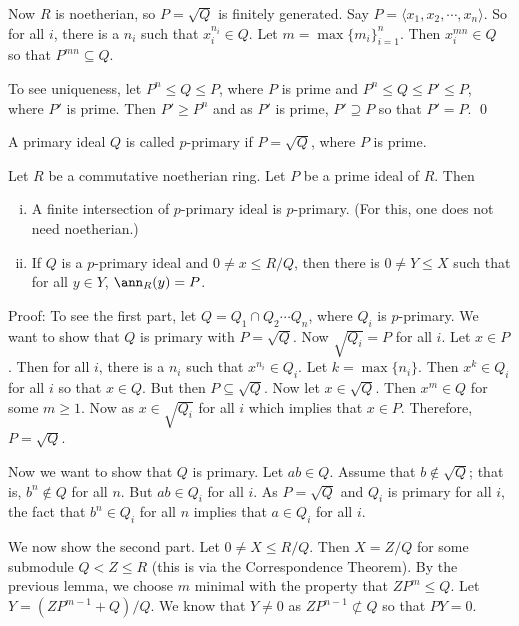  Now $R$ is noetherian, so $P=\sqrt{Q}$ is finitely generated. Say $P=\langle x_1,x_2,\cdots,x_n\rangle$. So for all $i$, there is a $n_i$ such that $x_i^{n_i} \in Q$. Let $m=\max \{m_i\}_{i=1}^n$. Then $x_i^{mn} \in Q$ so that $P^{mn} \subseteq Q$. 

To see uniqueness, let $P^n \leq Q \leq P$, where $P$ is prime and $P^n \leq Q \leq P' \leq P$, where $P'$ is prime. Then $P' \geq P^n$ and as $P'$ is prime, $P' \supseteq P$ so that $P'=P$. \qed \\

\begin{dfn}[p-primary]
A primary ideal $Q$ is called $p$-primary if $P=\sqrt{Q}$, where $P$ is prime. 
\end{dfn}

\begin{lem}
Let $R$ be a commutative noetherian ring. Let $P$ be a prime ideal of $R$. Then
\begin{enumerate}[(i)]
\item A finite intersection of $p$-primary ideal is $p$-primary. (For this, one does not need noetherian.)
\item If $Q$ is a $p$-primary ideal and $0 \neq x \leq R/Q$, then there is $0 \neq Y \leq X$ such that for all $y \in Y$, $\ann_R(y)=P$. 
\end{enumerate}
\end{lem}

Proof: To see the first part, let $Q=Q_1 \cap Q_2 \cdots Q_n$, where $Q_i$ is $p$-primary. We want to show that $Q$ is primary with $P=\sqrt{Q}$. Now $\sqrt{Q_i}=P$ for all $i$. Let $x \in P$. Then for all $i$, there is a $n_i$ such that $x^{n_i} \in Q_i$. Let $k=\max \{n_i\}$. Then $x^k \in Q_i$ for all $i$ so that $x \in Q$. But then $P \subseteq \sqrt{Q}$. Now let $x \in \sqrt{Q}$. Then $x^m \in Q$ for some $m \geq 1$. Now as $x \in \sqrt{Q_i}$ for all $i$ which implies that $x \in P$. Therefore, $P=\sqrt{Q}$. 

Now we want to show that $Q$ is primary. Let $ab \in Q$. Assume that $b \notin \sqrt{Q}$; that is, $b^n \notin Q$ for all $n$. But $ab \in Q_i$ for all $i$. As $P=\sqrt{Q}$ and $Q_i$ is primary for all $i$, the fact that $b^n \in Q_i$ for all $n$ implies that $a \in Q_i$ for all $i$.

We now show the second part. Let $0 \neq X \leq R/Q$. Then $X=Z/Q$ for some submodule $Q <Z\leq R$ (this is via the Correspondence Theorem). By the previous lemma, we choose $m$ minimal with the property that $ZP^m \leq Q$. Let $Y=(ZP^{m-1}+Q)/Q$. We know that $Y \neq 0$ as $ZP^{n-1} \not\subset Q$ so that $PY=0$. 

